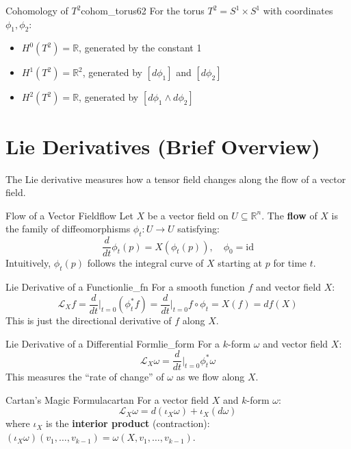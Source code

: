 \documentclass[11pt, letterpaper, openany]{book}
\begin{document}
\begin{thm}{Cohomology of $T^2$}{cohom_torus62}
For the torus $T^2 = S^1 \times S^1$ with coordinates $\phi_1, \phi_2$:
\begin{itemize}
    \item $H^0(T^2) = \mathbb{R}$, generated by the constant 1
    \item $H^1(T^2) = \mathbb{R}^2$, generated by $[d\phi_1]$ and $[d\phi_2]$
    \item $H^2(T^2) = \mathbb{R}$, generated by $[d\phi_1 \wedge d\phi_2]$
\end{itemize}
\end{thm}

\section{Lie Derivatives (Brief Overview)}

The Lie derivative measures how a tensor field changes along the flow of a vector field.

\begin{defn}{Flow of a Vector Field}{flow}
Let $X$ be a vector field on $U \subseteq \mathbb{R}^n$. The \textbf{flow} of $X$ is the family of diffeomorphisms $\phi_t: U \to U$ satisfying:
\[\frac{d}{dt} \phi_t(p) = X(\phi_t(p)), \quad \phi_0 = \text{id}\]
Intuitively, $\phi_t(p)$ follows the integral curve of $X$ starting at $p$ for time $t$.
\end{defn}

\begin{defn}{Lie Derivative of a Function}{lie_fn}
For a smooth function $f$ and vector field $X$:
\[\mathcal{L}_X f = \frac{d}{dt}\Big|_{t=0} (\phi_t^* f) = \frac{d}{dt}\Big|_{t=0} f \circ \phi_t = X(f) = df(X)\]
This is just the directional derivative of $f$ along $X$.
\end{defn}

\begin{defn}{Lie Derivative of a Differential Form}{lie_form}
For a $k$-form $\omega$ and vector field $X$:
\[\mathcal{L}_X \omega = \frac{d}{dt}\Big|_{t=0} \phi_t^* \omega\]
This measures the ``rate of change'' of $\omega$ as we flow along $X$.
\end{defn}

\begin{thm}{Cartan's Magic Formula}{cartan}
For a vector field $X$ and $k$-form $\omega$:
\[\mathcal{L}_X \omega = d(\iota_X \omega) + \iota_X (d\omega)\]
where $\iota_X$ is the \textbf{interior product} (contraction): $(\iota_X \omega)(v_1, \ldots, v_{k-1}) = \omega(X, v_1, \ldots, v_{k-1})$.
\end{thm}
\end{document}
